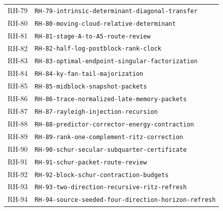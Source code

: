 \begin{longtable}{r >{\raggedright\arraybackslash}p{}}
RH-79 & \texttt{RH-\allowbreak{}79-\allowbreak{}intrinsic-\allowbreak{}determinant-\allowbreak{}diagonal-\allowbreak{}transfer}\\
RH-80 & \texttt{RH-\allowbreak{}80-\allowbreak{}moving-\allowbreak{}cloud-\allowbreak{}relative-\allowbreak{}determinant}\\
RH-81 & \texttt{RH-\allowbreak{}81-\allowbreak{}stage-\allowbreak{}A-\allowbreak{}to-\allowbreak{}A5-\allowbreak{}route-\allowbreak{}review}\\
RH-82 & \texttt{RH-\allowbreak{}82-\allowbreak{}half-\allowbreak{}log-\allowbreak{}postblock-\allowbreak{}rank-\allowbreak{}clock}\\
RH-83 & \texttt{RH-\allowbreak{}83-\allowbreak{}optimal-\allowbreak{}endpoint-\allowbreak{}singular-\allowbreak{}factorization}\\
RH-84 & \texttt{RH-\allowbreak{}84-\allowbreak{}ky-\allowbreak{}fan-\allowbreak{}tail-\allowbreak{}majorization}\\
RH-85 & \texttt{RH-\allowbreak{}85-\allowbreak{}midblock-\allowbreak{}snapshot-\allowbreak{}packets}\\
RH-86 & \texttt{RH-\allowbreak{}86-\allowbreak{}trace-\allowbreak{}normalized-\allowbreak{}late-\allowbreak{}memory-\allowbreak{}packets}\\
RH-87 & \texttt{RH-\allowbreak{}87-\allowbreak{}rayleigh-\allowbreak{}injection-\allowbreak{}recursion}\\
RH-88 & \texttt{RH-\allowbreak{}88-\allowbreak{}predictor-\allowbreak{}corrector-\allowbreak{}energy-\allowbreak{}contraction}\\
RH-89 & \texttt{RH-\allowbreak{}89-\allowbreak{}rank-\allowbreak{}one-\allowbreak{}complement-\allowbreak{}ritz-\allowbreak{}correction}\\
RH-90 & \texttt{RH-\allowbreak{}90-\allowbreak{}schur-\allowbreak{}secular-\allowbreak{}subquarter-\allowbreak{}certificate}\\
RH-91 & \texttt{RH-\allowbreak{}91-\allowbreak{}schur-\allowbreak{}packet-\allowbreak{}route-\allowbreak{}review}\\
RH-92 & \texttt{RH-\allowbreak{}92-\allowbreak{}block-\allowbreak{}schur-\allowbreak{}contraction-\allowbreak{}budgets}\\
RH-93 & \texttt{RH-\allowbreak{}93-\allowbreak{}two-\allowbreak{}direction-\allowbreak{}recursive-\allowbreak{}ritz-\allowbreak{}refresh}\\
RH-94 & \texttt{RH-\allowbreak{}94-\allowbreak{}source-\allowbreak{}seeded-\allowbreak{}four-\allowbreak{}direction-\allowbreak{}horizon-\allowbreak{}refresh}\\

\end{longtable}
